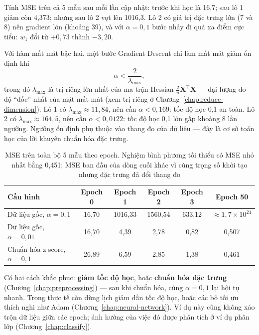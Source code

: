 Tính MSE trên cả 5 mẫu sau mỗi lần cập nhật: trước khi học là 16,7; sau lô 1 giảm còn 4,373; nhưng sau lô 2 vọt lên 1016,3. Lô 2 có giá trị đặc trưng lớn (7 và 8) nên gradient lớn (khoảng 39), và với $\alpha = 0{,}1$ bước nhảy đi quá xa điểm cực tiểu: $w_1$ đổi từ $+0{,}73$ thành $-3{,}20$.

Với hàm mất mát bậc hai, một bước Gradient Descent chỉ làm mất mát giảm ổn định khi
\begin{equation}
    \alpha < \frac{2}{\lambda_{\max}},
\end{equation}
trong đó $\lambda_{\max}$ là trị riêng lớn nhất của ma trận Hessian $\frac{2}{n}\mathbf{X}^\top\mathbf{X}$ --- đại lượng đo độ ``dốc'' nhất của mặt mất mát (xem trị riêng ở Chương~\ref{chap:reduce-dimension}). Lô 1 có $\lambda_{\max} \approx 11{,}84$, nên cần $\alpha < 0{,}169$: tốc độ học 0,1 an toàn. Lô 2 có $\lambda_{\max} \approx 164{,}5$, nên cần $\alpha < 0{,}0122$: tốc độ học 0,1 lớn gấp khoảng 8 lần ngưỡng. Ngưỡng ổn định phụ thuộc vào thang đo của dữ liệu --- đây là cơ sở toán học của lời khuyên chuẩn hóa đặc trưng.

\begin{table}[H]
\centering
\begin{tabular}{|l|c|c|c|c|c|}
\hline
\textbf{Cấu hình} & \textbf{Epoch 0} & \textbf{Epoch 1} & \textbf{Epoch 2} & \textbf{Epoch 3} & \textbf{Epoch 50} \\
\hline
Dữ liệu gốc, $\alpha = 0{,}1$ & 16,70 & 1016,33 & 1560,54 & 633,12 & $\approx 1{,}7 \times 10^{24}$ \\ \hline
Dữ liệu gốc, $\alpha = 0{,}01$ & 16,70 & 4,39 & 2,78 & 0,82 & 0,507 \\ \hline
Chuẩn hóa z-score, $\alpha = 0{,}1$ & 26,89 & 6,59 & 2,85 & 1,38 & 0,461 \\ \hline
\end{tabular}
\caption{MSE trên toàn bộ 5 mẫu theo epoch. Nghiệm bình phương tối thiểu có MSE nhỏ nhất bằng 0,451; MSE ban đầu của dòng cuối khác vì cùng trọng số khởi tạo nhưng đặc trưng đã đổi thang đo}
\label{tab:minibatch-epochs}
\end{table}


Có hai cách khắc phục: \textbf{giảm tốc độ học}, hoặc \textbf{chuẩn hóa đặc trưng} (Chương~\ref{chap:preprocessing}) --- sau khi chuẩn hóa, cùng $\alpha = 0{,}1$ lại hội tụ nhanh. Trong thực tế còn dùng lịch giảm dần tốc độ học, hoặc các bộ tối ưu thích nghi như Adam (Chương~\ref{chap:neural-network}). Ví dụ này cũng không xáo trộn dữ liệu giữa các epoch; ảnh hưởng của việc đó được phân tích ở ví dụ phân lớp (Chương~\ref{chap:classify}).

